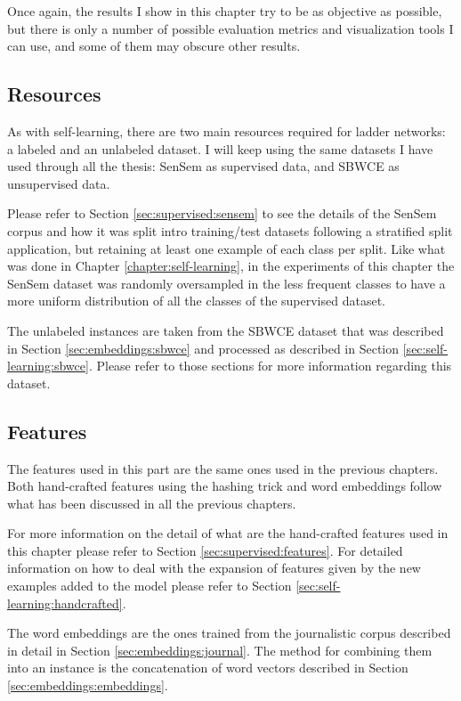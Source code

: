 Once again, the results I show in this chapter try to be as objective as
possible, but there is only a number of possible evaluation metrics and
visualization tools I can use, and some of them may obscure other results.

\subsection{Resources}

As with self-learning, there are two main resources required for ladder
networks: a labeled and an unlabeled dataset. I will keep using the same
datasets I have used through all the thesis: SenSem as supervised data, and
SBWCE as unsupervised data. 

Please refer to Section \ref{sec:supervised:sensem} to see the details of the
SenSem corpus and how it was split intro training/test datasets following a
stratified split application, but retaining at least one example of each class
per split. Like what was done in Chapter \ref{chapter:self-learning}, in the
experiments of this chapter the SenSem dataset was randomly oversampled in the
less frequent classes to have a more uniform distribution of all the classes of
the supervised dataset.

The unlabeled instances are taken from the SBWCE dataset that was described in
Section \ref{sec:embeddings:sbwce} and processed as described in Section
\ref{sec:self-learning:sbwce}. Please refer to those sections for more
information regarding this dataset.

\subsection{Features}

The features used in this part are the same ones used in the previous chapters.
Both hand-crafted features using the hashing trick and word embeddings follow
what has been discussed in all the previous chapters.

For more information on the detail of what are the hand-crafted features used
in this chapter please refer to Section \ref{sec:supervised:features}. For
detailed information on how to deal with the expansion of features given by the
new examples added to the model please refer to Section
\ref{sec:self-learning:handcrafted}.

The word embeddings are the ones trained from the journalistic corpus described
in detail in Section \ref{sec:embeddings:journal}. The method for combining
them into an instance is the concatenation of word vectors described in Section
\ref{sec:embeddings:embeddings}.

